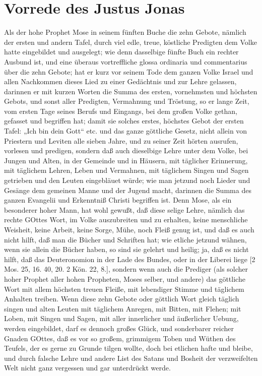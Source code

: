 \section{Vorrede des Justus Jonas}

Als der hohe Prophet Mose in seinem fünften Buche die zehn Gebote, nämlich der ersten und andern Tafel, durch viel edle, treue, köstliche Predigten dem Volke hatte eingebildet und ausgelegt; wie denn dasselbige fünfte Buch ein rechter Ausbund ist, und eine überaus vortreffliche glossa ordinaria und commentarius über die zehn Gebote; hat er kurz vor seinem Tode dem ganzen Volke Israel und allen Nachkommen dieses Lied zu einer Gedächtnis und zur Lehre gelassen, darinnen er mit kurzen Worten die Summa des ersten, vornehmsten und höchsten Gebots, und sonst aller Predigten, Vermahnung und Tröstung, so er lange Zeit, vom ersten Tage seines Berufs und Eingangs, bei dem großen Volke gethan, gefasset und begriffen hat; damit sie solches erstes, höchstes Gebot der ersten Tafel: „Ich bin dein Gott“ etc. und das ganze göttliche Gesetz, nicht allein von Priestern und Leviten alle sieben Jahre, und zu seiner Zeit hörten ausrufen, vorlesen und predigen, sondern daß auch dieselbige Lehre unter dem Volke, bei Jungen und Alten, in der Gemeinde und in Häusern, mit täglicher Erinnerung, mit täglichem Lehren, Leben und Vermahnen, mit täglichem Singen und Sagen getrieben und den Leuten eingebläuet würde; wie man jetzund noch Lieder und Gesänge dem gemeinen Manne und der Jugend macht, darinnen die Summa des ganzen Evangelii und Erkenntniß Christi begriffen ist. Denn Mose, als ein besonderer hoher Mann, hat wohl gewußt, daß diese selige Lehre, nämlich das rechte GOttes Wort, im Volke auszubreiten und zu erhalten, keine menschliche Weisheit, keine Arbeit, keine Sorge, Mühe, noch Fleiß genug ist, und daß es auch nicht hilft, daß man die Bücher und Schriften hat; wie etliche jetzund wähnen, wenn sie allein die Bücher haben, so sind sie gelehrt und heilig; ja, daß es nicht hilft, daß das Deuteronomion in der Lade des Bundes, oder in der Liberei liege [2 Mos. 25, 16. 40, 20. 2 Kön. 22, 8.], sondern wenn auch die Prediger (als solcher hoher Prophet aller hohen Propheten, Moses selber, und andere) das göttliche Wort mit allem höchsten treuen Fleiße, mit lebendiger Stimme und täglichem Anhalten treiben. Wenn diese zehn Gebote oder göttlich Wort gleich täglich singen und alten Leuten mit täglichem Anregen, mit Bitten, mit Flehen; mit Loben, mit Singen und Sagen, mit aller innerlicher und äußerlicher Uebung, werden eingebildet, darf es dennoch großes Glück, und sonderbarer reicher Gnaden GOttes, daß es vor so großem, grimmigem Toben und Wüthen des Teufels, der es gerne zu Grunde tilgen wollte, doch bei etlichen hafte und bleibe, und durch falsche
Lehre und andere List des Satans und Bosheit der verzweifelten Welt nicht ganz vergessen und gar unterdrückt werde.

